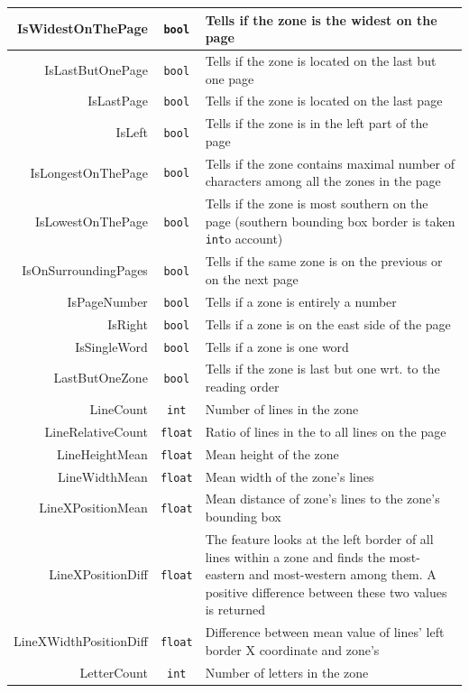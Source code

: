 \begin{appendix}
\begin{longtable}[c]{|r|c|p{8cm}|}
IsWidestOnThePage & \verb+bool+ & Tells if the zone is the widest on the page\\ \hline
IsLastButOnePage & \verb+bool+ & Tells if the zone is located on the last but one page\\ \hline
IsLastPage & \verb+bool+ & Tells if the zone is located on the last page\\ \hline
IsLeft & \verb+bool+ & Tells if the zone is in the left part of the page\\ \hline
IsLongestOnThePage & \verb+bool+ & Tells if the zone contains maximal number of characters among all the zones in the page\\ \hline
IsLowestOnThePage & \verb+bool+ & Tells if the zone is most southern on the page (southern bounding box border is taken \verb+int+o account) \\ \hline
IsOnSurroundingPages & \verb+bool+ & Tells if the same zone is on the previous or on the next page \\ \hline
IsPageNumber & \verb+bool+ & Tells if a zone is entirely a number \\ \hline
IsRight & \verb+bool+ & Tells if a zone is on the east side of the page\\ \hline
IsSingleWord & \verb+bool+ & Tells if a zone is one word \\ \hline
LastButOneZone & \verb+bool+ & Tells if the zone is last but one wrt. to the reading order \\ \hline
LineCount & \verb+int+ & Number of lines in the zone\\ \hline
LineRelativeCount & \verb+float+ & Ratio of lines in the to all lines on the page\\ \hline
LineHeightMean & \verb+float+ & Mean height of the zone\\ \hline
LineWidthMean & \verb+float+ & Mean width of the zone's lines\\ \hline
LineXPositionMean & \verb+float+ & Mean distance of zone's lines to the zone's bounding box \\ \hline
LineXPositionDiff & \verb+float+ & The feature looks at the left border of all lines within a zone and finds the most-eastern and most-western among them. A positive difference between these two values is returned\\ \hline
LineXWidthPositionDiff & \verb+float+ & Difference between mean value of lines' left border X coordinate and zone's  \\ \hline
LetterCount & \verb+int+ & Number of letters in the zone\\ \hline

\end{longtable}
\end{appendix}
